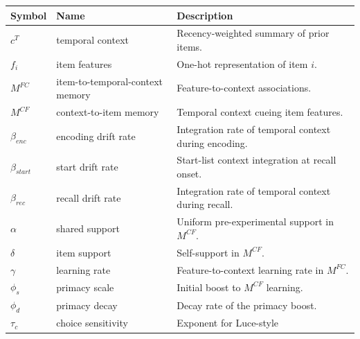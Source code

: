 \documentclass[
  man,
  longtable,
  nolmodern,
  notxfonts,
  notimes,
  draftfirst,
  colorlinks=true,linkcolor=blue,citecolor=blue,urlcolor=blue]{apa7}
\begin{document}
\begin{table}

{\caption{{Parameters and structures specifying
eCMR.}{\label{tbl-ecmr-parameters}}}
\vspace{-20pt}}

\begin{longtable}[]{@{}
  >{\raggedright\arraybackslash}p{}
  >{\raggedright\arraybackslash}p{}
  >{\raggedright\arraybackslash}p{}@{}}
\toprule\noalign{}
\begin{minipage}[b]{\linewidth}\raggedright
Symbol
\end{minipage} & \begin{minipage}[b]{\linewidth}\raggedright
Name
\end{minipage} & \begin{minipage}[b]{\linewidth}\raggedright
Description
\end{minipage} \\
\midrule\noalign{}
\endhead
\bottomrule\noalign{}
\endlastfoot
\(c^T\) & temporal context & Recency-weighted summary of prior items. \\
\(f_i\) & item features & One-hot representation of item \(i\). \\
\(M^{FC}\) & item-to-temporal-context memory & Feature-to-context
associations. \\
\(M^{CF}\) & context-to-item memory & Temporal context cueing item
features. \\
\(\beta_{enc}\) & encoding drift rate & Integration rate of temporal
context during encoding. \\
\(\beta_{start}\) & start drift rate & Start-list context integration at
recall onset. \\
\(\beta_{rec}\) & recall drift rate & Integration rate of temporal
context during recall. \\
\(\alpha\) & shared support & Uniform pre-experimental support in
\(M^{CF}\). \\
\(\delta\) & item support & Self-support in \(M^{CF}\). \\
\(\gamma\) & learning rate & Feature-to-context learning rate in
\(M^{FC}\). \\
\(\phi_s\) & primacy scale & Initial boost to \(M^{CF}\) learning. \\
\(\phi_d\) & primacy decay & Decay rate of the primacy boost. \\
\(\tau_c\) & choice sensitivity & Exponent for Luce-style

\end{longtable}
\end{table}
\end{document}
